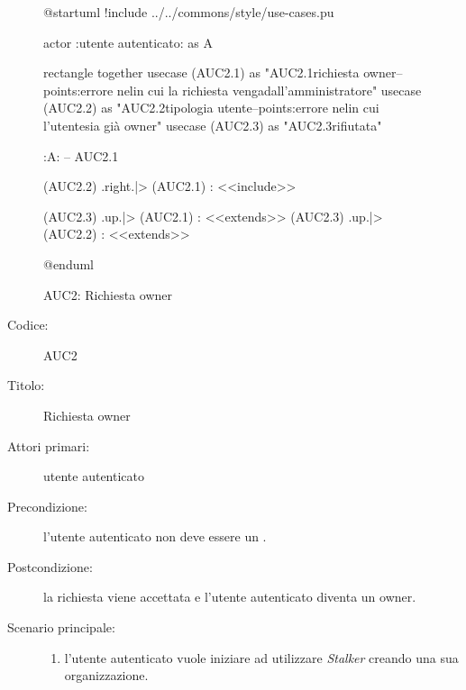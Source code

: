 \documentclass[../../../analisi-dei-requisiti.tex]{subfiles}
\begin{document}
\begin{figure}[H]
  \centering
  \begin{plantuml}
  @startuml
  !include ../../commons/style/use-cases.pu

  actor :utente autenticato: as A

  rectangle {
    together {
      usecase (AUC2.1) as "AUC2.1\nInvio richiesta owner\n--\nExtension points:\nVisualizzazione errore nel\ncaso in cui la richiesta venga\nrifiutata dall'amministratore"
      usecase (AUC2.2) as "AUC2.2\nVerifica tipologia utente\n--\nExtension points:\nVisualizzazione errore nel\ncaso in cui l'utente\nautenticato sia già owner"
    }
      usecase (AUC2.3) as "AUC2.3\nRichiesta rifiutata"
    }

  :A: -- AUC2.1

  (AUC2.2) .right.|> (AUC2.1) : <<include>>

  (AUC2.3) .up.|> (AUC2.1) : <<extends>>
  (AUC2.3) .up.|> (AUC2.2) : <<extends>>

  @enduml
  \end{plantuml}
  \caption{AUC2: Richiesta owner}
  \label{fig:auc2}
\end{figure}

\begin{description}
  \item[Codice:] AUC2
  \item[Titolo:] Richiesta owner
  \item[Attori primari:] utente autenticato
  \item[Precondizione:] l'utente autenticato non deve essere un .
  \item[Postcondizione:] la richiesta viene accettata e l'utente autenticato diventa un owner.
  \item[Scenario principale:]
  \begin{enumerate}
    \item l'utente autenticato vuole iniziare ad utilizzare \emph{Stalker} creando una sua organizzazione.
  \end{enumerate}
\end{description}
\end{document}
